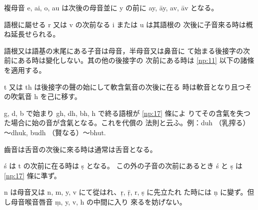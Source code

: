 \numberParagraph \label{np:31}
複母音 e, ai, o, au は次後の母音並に y の前に ay, āy,
av, āv となる。

\numberParagraph
語根に屬せる r 又は v の次前なる i または u は其語根の
次後に子音來る時は槪ね延長せられる。

\numberParagraph
語根又は語基の末尾にある子音は母音，半母音又は鼻音に
て始まる後接字の次前にある時は變化しない。其の他の後接字の
次前にある時は \ref{np:11} 以下の諸條を適用する。

\numberParagraph
t 又は th は後接字の聲の始にして軟含氣音の次後に在る
時は軟音となり且つその吹氣音 h を己に移す。

\numberParagraph \label{np:35}
g, d, b で始まり gh, dh, bh, h で終る語根が \ref{np:17} 條によ
りてその含氣を失つた場合に始の音が含氣となる。これを代償の
法則と云ふ。例：duh （乳搾る）～dhuk, budh （賢なる）～bhut.

\numberParagraph
齒音は舌音の次後に來る時は通常は舌音となる。

\numberParagraph
ś は t の次前に在る時は ṣ となる。
この外の子音の次前にあるとき ś と ṣ は \ref{np:17} 條に準ず。

\numberParagraph
n は母音又は n, m, y, v にて從はれ、ṛ, ṝ, r, ṣ に先立たれ
た時には ṇ に變ず。但し母音喉音唇音 ṃ, y, v, h の中間に入り
來るを妨げない。

